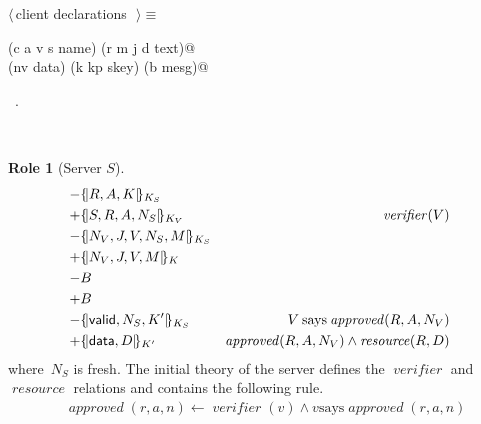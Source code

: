 \documentclass[titlepage,12pt]{article}
\theoremstyle{definition}
\newtheorem{role}{Role}
\newcommand{\inbnd}{\mathord -}
\newcommand{\outbnd}{\mathord +}
\newcommand{\says}{\mathbin{\mathrm{says}}}
\DeclareMathOperator{\resource}{\mathit{resource}}
\DeclareMathOperator{\approved}{\mathit{approved}}
\DeclareMathOperator{\verifier}{\mathit{verifier}}
\begin{document}
\begin{flushleft} \small
\begin{minipage}{\linewidth} \label{scrap16}
$\langle\,$client declarations\nobreak\ {\footnotesize {}}$\,\rangle\equiv$
\vspace{-1ex}
\begin{list}{}{} \item
\mbox{}\verb@(c a v s name) (r m j d text)@\\
\mbox{}\verb@(nv data) (k kp skey) (b mesg)@{\NWsep}
\end{list}
\vspace{-1ex}
\footnotesize\addtolength{\baselineskip}{-1ex}
\begin{list}{}{\setlength{\itemsep}{-\parsep}\setlength{\itemindent}{-\leftmargin}}
\item \NWtxtMacroRefIn\ .
\end{list}
\end{minipage}\\[4ex]
\end{flushleft}
\begin{role}[Server $S$]
\begin{eqnarray}
&\inbnd\ctosa\\
&\outbnd\stova&\verifier(V)\\
&\inbnd\vtosa\\
&\outbnd\stoca\\
&\inbnd B\\
&\outbnd B\\
&\inbnd\vtosb&V\says\approved(R,A,N_V)\\
&\outbnd\stocb&\approved(R,A,N_V)\land\resource(R,D)
\end{eqnarray}
where~$N_S$ is fresh.  The initial
theory of the server defines the $\verifier$ and $\resource$
relations and contains the following rule.
\begin{eqnarray}
&\approved(r,a,n)\gets\verifier(v)\land
  v\says\approved(r,a,n)\label{eq:trust verifier}
\end{eqnarray}
\end{role}
\end{document}
